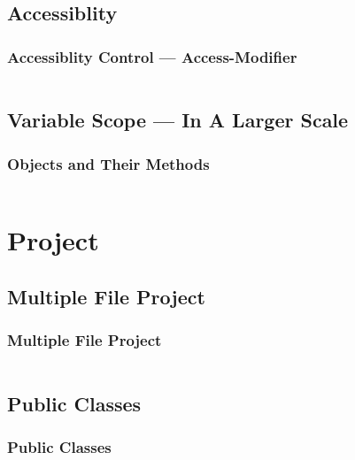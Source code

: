 \documentclass[en, 11pt, xcolor=dvipsnames]{beamer}
\begin{document}
\subsection{Accessiblity}
\begin{frame}[fragile]
	\frametitle{Accessiblity Control --- Access-Modifier}

	\begin{columns}
		\begin{column}{0.98\textwidth}

		\end{column}
	\end{columns}

\end{frame}

\subsection{Variable Scope --- In A Larger Scale}
\begin{frame}[fragile]
	\frametitle{Objects and Their Methods}

	\begin{columns}
		\begin{column}{0.98\textwidth}

		\end{column}
	\end{columns}

\end{frame}


\section{Project}
\subsection{Multiple File Project}
\begin{frame}[fragile]
	\frametitle{Multiple File Project}

	\begin{columns}
		\begin{column}{0.98\textwidth}

		\end{column}
	\end{columns}

\end{frame}

\subsection{Public Classes}
\begin{frame}[fragile]
	\frametitle{Public Classes}

	\begin{columns}
		\begin{column}{0.98\textwidth}

		\end{column}
	\end{columns}

\end{frame}
\end{document}
